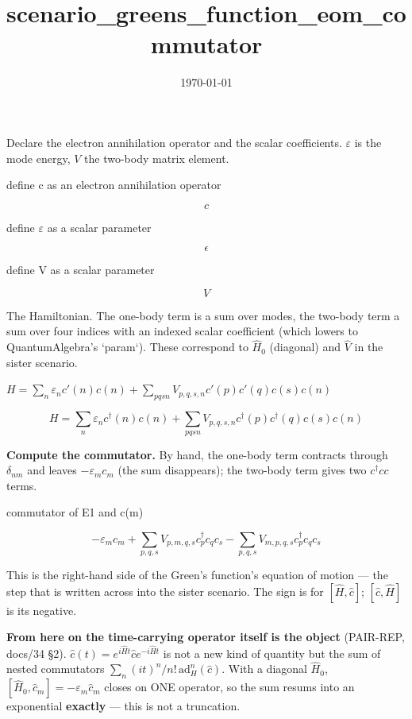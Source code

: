 \documentclass[dvipdfmx]{article}
\title{scenario\_greens\_function\_eom\_commutator}
\date{\today}
\begin{document}
\maketitle

Declare the electron annihilation operator and the scalar coefficients. $\varepsilon$ is the mode energy, $V$ the two-body matrix element.

define c as an electron annihilation operator

\[
  c
\]

define $\varepsilon$ as a scalar parameter

\[
  \epsilon
\]

define V as a scalar parameter

\[
  V
\]

The Hamiltonian. The one-body term is a sum over modes, the two-body term a sum over four indices with an indexed scalar coefficient (which lowers to QuantumAlgebra's `param`). These correspond to $\hat H_0$ (diagonal) and $\hat V$ in the sister scenario.

$H = \sum_n \varepsilon_n c'(n) c(n) + \sum_{p q s n} V_{p,q,s,n} c'(p) c'(q) c(s) c(n)$

\begin{equation}
  H = \sum_n \varepsilon_n c^{\dagger}(n) c(n) + \sum_{p q s n} V_{p,q,s,n} c^{\dagger}(p) c^{\dagger}(q) c(s) c(n)
  \label{eq:E1}
\end{equation}

\textbf{Compute the commutator.} By hand, the one-body term contracts through $\delta_{nm}$ and leaves $-\varepsilon_m c_m$ (the sum disappears); the two-body term gives two $c^\dagger c c$ terms.

commutator of E1 and c(m)

\begin{equation}
  - \varepsilon_{m} {c}_{m} + \sum_{p,q,s} V_{p,m,q,s} {c}_{p}^{\dagger} {c}_{q} {c}_{s} - \sum_{p,q,s} V_{m,p,q,s} {c}_{p}^{\dagger} {c}_{q} {c}_{s}
  \label{eq:E2}
\end{equation}

This is the right-hand side of the Green's function's equation of motion — the step that is written across into the sister scenario. The sign is for $[\hat H,\hat c]$; $[\hat c,\hat H]$ is its negative.

\textbf{From here on the time-carrying operator itself is the object} (PAIR-REP, docs/34 §2). $\hat c(t)=e^{i\hat Ht}\hat ce^{-i\hat Ht}$ is not a new kind of quantity but the sum of nested commutators $\sum_n (it)^n/n!\,\mathrm{ad}_H^n(\hat c)$. With a diagonal $\hat H_0$, $[\hat H_0,\hat c_m]=-\varepsilon_m\hat c_m$ closes on ONE operator, so the sum resums into an exponential \textbf{exactly} — this is not a truncation.
\end{document}
